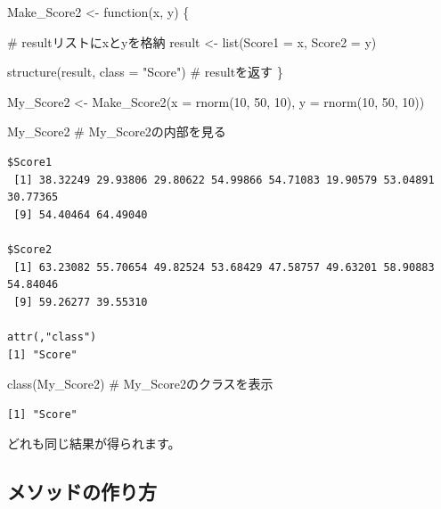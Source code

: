 \documentclass[
  a4paper,
  pandoc,
  ja=standard,
  jafont=haranoaji]{bxjsbook}
\newenvironment{Shaded}{\begin{snugshade}}{\end{snugshade}}
\newcommand{\AttributeTok}[1]{\textcolor[rgb]{0.00,0.48,0.65}{#1}}
\newcommand{\CommentTok}[1]{\textcolor[rgb]{0.37,0.37,0.37}{#1}}
\newcommand{\ControlFlowTok}[1]{\textcolor[rgb]{0.00,0.48,0.65}{#1}}
\newcommand{\DecValTok}[1]{\textcolor[rgb]{0.68,0.00,0.00}{#1}}
\newcommand{\FunctionTok}[1]{\textcolor[rgb]{0.28,0.35,0.67}{#1}}
\newcommand{\NormalTok}[1]{\textcolor[rgb]{0.00,0.48,0.65}{#1}}
\newcommand{\OtherTok}[1]{\textcolor[rgb]{0.00,0.48,0.65}{#1}}
\newcommand{\StringTok}[1]{\textcolor[rgb]{0.13,0.47,0.30}{#1}}
\begin{document}
\begin{Shaded}
\begin{Highlighting}[numbers=left,,]
\NormalTok{Make\_Score2 }\OtherTok{\textless{}{-}} \ControlFlowTok{function}\NormalTok{(x, y) \{}
  
  \CommentTok{\# resultリストにxとyを格納}
\NormalTok{  result }\OtherTok{\textless{}{-}} \FunctionTok{list}\NormalTok{(}\AttributeTok{Score1 =}\NormalTok{ x, }\AttributeTok{Score2 =}\NormalTok{ y)}
  
  \FunctionTok{structure}\NormalTok{(result, }\AttributeTok{class =} \StringTok{"Score"}\NormalTok{) }\CommentTok{\# resultを返す}
\NormalTok{\}}

\NormalTok{My\_Score2 }\OtherTok{\textless{}{-}} \FunctionTok{Make\_Score2}\NormalTok{(}\AttributeTok{x =} \FunctionTok{rnorm}\NormalTok{(}\DecValTok{10}\NormalTok{, }\DecValTok{50}\NormalTok{, }\DecValTok{10}\NormalTok{),}
                         \AttributeTok{y =} \FunctionTok{rnorm}\NormalTok{(}\DecValTok{10}\NormalTok{, }\DecValTok{50}\NormalTok{, }\DecValTok{10}\NormalTok{))}

\NormalTok{My\_Score2 }\CommentTok{\# My\_Score2の内部を見る}
\end{Highlighting}
\end{Shaded}

\begin{verbatim}
$Score1
 [1] 38.32249 29.93806 29.80622 54.99866 54.71083 19.90579 53.04891 30.77365
 [9] 54.40464 64.49040

$Score2
 [1] 63.23082 55.70654 49.82524 53.68429 47.58757 49.63201 58.90883 54.84046
 [9] 59.26277 39.55310

attr(,"class")
[1] "Score"
\end{verbatim}

\begin{Shaded}
\begin{Highlighting}[numbers=left,,]
\FunctionTok{class}\NormalTok{(My\_Score2) }\CommentTok{\# My\_Score2のクラスを表示}
\end{Highlighting}
\end{Shaded}

\begin{verbatim}
[1] "Score"
\end{verbatim}

どれも同じ結果が得られます。

\hypertarget{ux30e1ux30bdux30c3ux30c9ux306eux4f5cux308aux65b9}{%
\subsection{メソッドの作り方}\label{ux30e1ux30bdux30c3ux30c9ux306eux4f5cux308aux65b9}}
\end{document}

